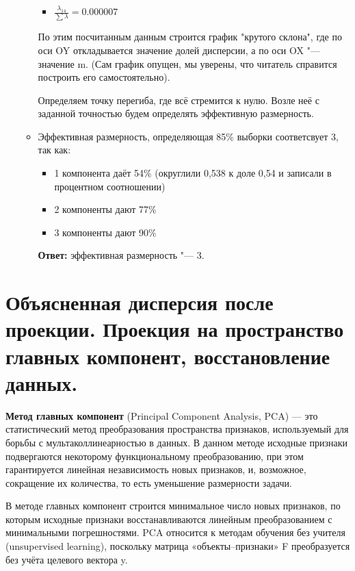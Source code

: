 \begin{enumerate}
\begin{itemize}
\begin{itemize}
            \item $\frac{ \lambda_{14} }{\sum \lambda} = 0.000007$
        \end{itemize} \par
        По этим посчитанным данным строится график "крутого склона", где по оси OY откладывается значение долей дисперсии, а по оси OX "--- значение m. (Сам график опущен, мы уверены, что читатель справится построить его самостоятельно). \par
        Определяем точку перегиба, где всё стремится к нулю. Возле неё с заданной точностью будем определять эффективную размерность.
        \item Эффективная размерность, определяющая 85\% выборки соответсвует 3, так как: \par
        \begin{itemize}
            \item 1 компонента даёт 54\% (округлили 0,538 к доле 0,54 и записали в процентном соотношении)
            \item 2 компоненты дают 77\%
            \item 3 компоненты дают 90\%
        \end{itemize}\par
        \textbf{Ответ:} эффективная размерность "--- 3.
    \end{itemize}

\end{enumerate}

\section{Объясненная дисперсия после проекции. Проекция на пространство главных компонент, восстановление данных.}

\textbf{Метод главных компонент} (Principal Component Analysis, PCA) — это статистический метод преобразования пространства признаков, используемый для борьбы с мультаколлинеарностью в данных. В данном методе исходные признаки подвергаются некоторому функциональному преобразованию, при этом гарантируется линейная независимость новых признаков, и, возможное, сокращение их количества, то есть уменьшение размерности задачи. 

В методе главных компонент строится минимальное число новых признаков, по которым исходные признаки восстанавливаются линейным преобразованием с минимальными погрешностями. PCA относится к методам обучения без учителя (unsupervised learning), поскольку матрица «объекты–признаки» F преобразуется без учёта целевого вектора y.


